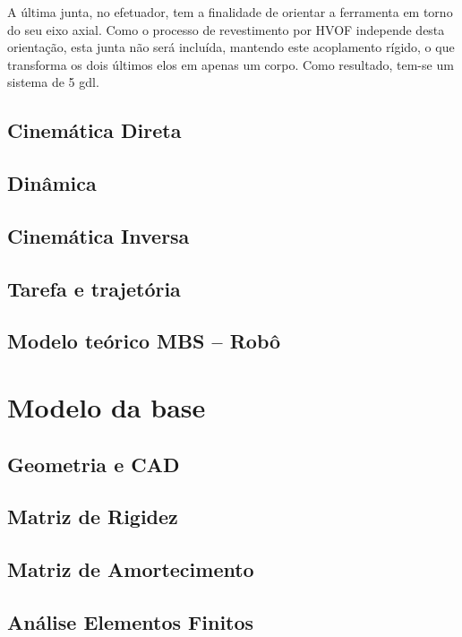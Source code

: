 A última junta, no efetuador, tem a finalidade de orientar a ferramenta em torno
do seu eixo axial. Como o processo de revestimento por HVOF independe desta
orientação, esta junta não será incluída, mantendo este acoplamento rígido, o
que transforma os dois últimos elos em apenas um corpo.
Como resultado, tem-se um sistema de 5 gdl.


\subsection{Cinemática Direta}

\subsection{Dinâmica}

\subsection{Cinemática Inversa}

\subsection{Tarefa e trajetória}

\subsection{Modelo teórico MBS -- Robô}


\section{Modelo da base}

\subsection{Geometria e CAD}

\subsection{Matriz de Rigidez}

\subsection{Matriz de Amortecimento}

\subsection{Análise Elementos Finitos}

